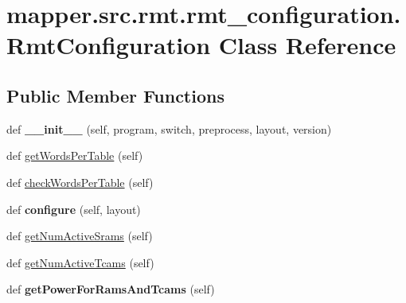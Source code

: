 \hypertarget{classmapper_1_1src_1_1rmt_1_1rmt__configuration_1_1_rmt_configuration}{}\section{mapper.\+src.\+rmt.\+rmt\+\_\+configuration.\+Rmt\+Configuration Class Reference}
\label{classmapper_1_1src_1_1rmt_1_1rmt__configuration_1_1_rmt_configuration}
\subsection*{Public Member Functions}
\begin{DoxyCompactItemize}
\item 
\hypertarget{classmapper_1_1src_1_1rmt_1_1rmt__configuration_1_1_rmt_configuration_a85a5c0befa5eec17c2a0a5a07b1964cb}{}def {\bfseries \+\_\+\+\_\+init\+\_\+\+\_\+} (self, program, switch, preprocess, layout, version)\label{classmapper_1_1src_1_1rmt_1_1rmt__configuration_1_1_rmt_configuration_a85a5c0befa5eec17c2a0a5a07b1964cb}

\item 
def \hyperlink{classmapper_1_1src_1_1rmt_1_1rmt__configuration_1_1_rmt_configuration_ae124987c99616f3d2677d0dbf38f8e46}{get\+Words\+Per\+Table} (self)
\item 
def \hyperlink{classmapper_1_1src_1_1rmt_1_1rmt__configuration_1_1_rmt_configuration_a59f829aa5055cbea58317f633070628a}{check\+Words\+Per\+Table} (self)
\item 
\hypertarget{classmapper_1_1src_1_1rmt_1_1rmt__configuration_1_1_rmt_configuration_a2068fbf2a9d2fd2c60fb5f918e16be22}{}def {\bfseries configure} (self, layout)\label{classmapper_1_1src_1_1rmt_1_1rmt__configuration_1_1_rmt_configuration_a2068fbf2a9d2fd2c60fb5f918e16be22}

\item 
def \hyperlink{classmapper_1_1src_1_1rmt_1_1rmt__configuration_1_1_rmt_configuration_addac7d5efd6ed342cdd04678de927704}{get\+Num\+Active\+Srams} (self)
\item 
def \hyperlink{classmapper_1_1src_1_1rmt_1_1rmt__configuration_1_1_rmt_configuration_a482e813d2039fc6662a542662e012371}{get\+Num\+Active\+Tcams} (self)
\item 
\hypertarget{classmapper_1_1src_1_1rmt_1_1rmt__configuration_1_1_rmt_configuration_a46b637f4ebb0150373679926e75453e9}{}def {\bfseries get\+Power\+For\+Rams\+And\+Tcams} (self)\label{classmapper_1_1src_1_1rmt_1_1rmt__configuration_1_1_rmt_configuration_a46b637f4ebb0150373679926e75453e9}


\end{DoxyCompactItemize}
